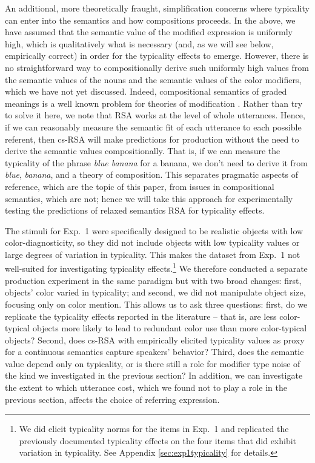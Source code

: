 \documentclass[11pt]{article}
\newcommand{\appref}[1]{Appendix \ref{#1}}
\begin{document}
An additional, more theoretically fraught, simplification concerns where typicality can enter into the semantics and how compositions proceeds. In the above, we have assumed that the semantic value of the modified expression is uniformly high, which is qualitatively what is necessary (and, as we will see below, empirically correct) in order for the typicality effects to emerge. However, there is no straightforward way to compositionally derive such uniformly high values from the semantic values of the nouns and the semantic values of the color modifiers, which we have not yet discussed. Indeed, compositional semantics of graded meanings is a well known problem for theories of modification \cite{kamp1995,Osherson1981}. Rather than try to solve it here, we note that RSA works at the level of whole utterances. Hence, if we can reasonably measure the semantic fit of each utterance to each possible referent, then cs-RSA will make predictions for production without the need to derive the semantic values compositionally. That is, if we can measure the typicality of the phrase \emph{blue banana} for a banana, we don't need to derive it from \emph{blue}, \emph{banana}, and a theory of composition. This separates pragmatic aspects of reference, which are the topic of this paper, from issues in compositional semantics, which are not; hence we will take this approach for experimentally testing the predictions of relaxed semantics RSA for typicality effects.


The stimuli for Exp.~1 were specifically designed to be realistic objects with low color-diagnosticity, so they did not include objects with low typicality values or large degrees of variation in typicality. This makes the dataset from Exp.~1 not well-suited for investigating typicality effects.\footnote{We did elicit typicality norms for the items in Exp.~1 and replicated the previously documented typicality effects on the four items that did exhibit variation in typicality. See \appref{sec:exp1typicality} for details.} We therefore conducted a separate production experiment in the same paradigm but with two broad changes: first, objects' color varied in typicality; and second, we did not manipulate object size, focusing only on color mention. This allows us to ask three questions: first, do we replicate the typicality effects reported in the literature -- that is, are less color-typical objects more likely to lead to redundant color use than more color-typical objects? Second, does cs-RSA with empirically elicited typicality values as proxy for a continuous semantics capture speakers' behavior? Third, does the semantic value depend only on typicality, or is there still a role for modifier type noise of the kind we investigated in the previous section? In addition, we can investigate the extent to which utterance cost, which we found not to play a role in the previous section, affects the choice of referring expression.
\end{document}
